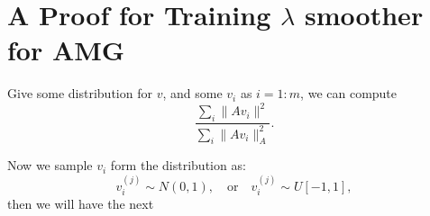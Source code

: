 \section{A Proof for Training $\lambda$ smoother for AMG}
Give some distribution for $v$, and some $v_i$ as $i = 1:m$, we can compute 
\begin{equation}
	\frac{\sum_i \|Av_i\|^2}{\sum_i \|Av_i\|_A^2}.
\end{equation}

Now we sample $v_i$ form the distribution as:
\begin{equation}\label{sample}
v_i^{(j)} \sim N(0,1),  \quad \text{or}\quad  v_i^{(j)}  \sim U[-1,1],
\end{equation}
then we will have the next 